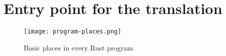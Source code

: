\section{Entry point for the translation}

\begin{figure}[!htb]
  \centering
  \texttt{[image: program-places.png]}
  \caption{Basic places in every Rust program}
  \label{fig:program-places}
\end{figure}